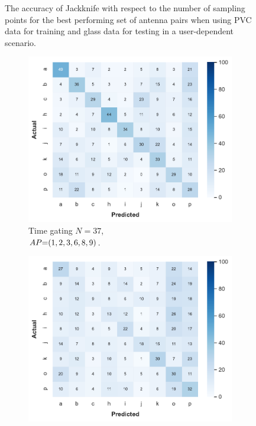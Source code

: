 \begin{figure}[ht]
  \vspace{-6pt}
  \caption{The accuracy of Jackknife with respect to the number of sampling points for the best performing set of antenna pairs when using PVC data for training and glass data for testing in a user-dependent scenario.}
  \label{fig:radar-experiments:through-materials:pvc-glass-samples}
\end{figure}

\begin{figure}[ht]
  \begin{subfigure}{.49\textwidth}
      \centering
      \includegraphics[width=.99\linewidth]{Figures/RadarExperiments/Datasets/ThroughMaterials/PVC+Glass/confusion-timegating-ud.pdf}
      \vspace{-15pt}
      \captionsetup{width=.99\linewidth}
      \caption{Time gating $N{=}37$, \\ $\splitatcommas{AP{=}(1, 2, 3, 6, 8, 9)}$.}
      \label{fig:radar-experiments:through-materials:pvc-glass-confusion:timegating-ud}
  \end{subfigure}
  \begin{subfigure}{.49\textwidth}
      \centering
      \includegraphics[width=.99\linewidth]{Figures/RadarExperiments/Datasets/ThroughMaterials/PVC+Glass/confusion-filtering-ud.pdf}

\end{subfigure}
\end{figure}
